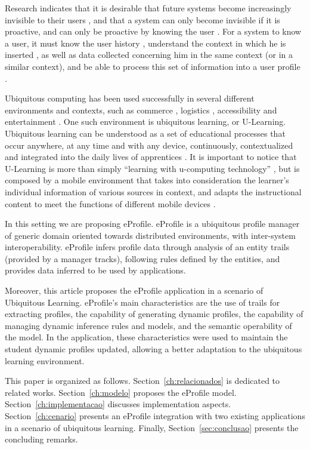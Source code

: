 \documentclass[preprint,authoryear,12pt,dvipdfm]{elsarticle}
\begin{document}
Research indicates that it is desirable that future systems become increasingly invisible to their users \citep{weiser96}, and that a system can only become invisible if it is proactive, and can only be proactive by knowing the user \citep{satyanarayanan01}. For a system to know a user, it must know the user history \citep{silva10}, understand the context in which he is inserted \citep{dey2001}, as well as data collected concerning him in the same context (or in a similar context), and be able to process this set of information into a user profile \citep{fischer01,viviani10}.

Ubiquitous computing has been used successfully in several different environments and contexts, such as commerce \citep{franco11}, logistics \citep{oliveira13}, accessibility \citep{tavares12} and entertainment \citep{segatto08}. One such environment is ubiquitous learning, or U-Learning. Ubiquitous learning can be understood as a set of educational processes that occur anywhere, at any time and with any device, continuously, contextualized and integrated into the daily lives of apprentices \citep{barbosa11}. It is important to notice that U-Learning is more than simply ``learning with u-computing technology'' \citep{hwang07}, but is composed by a mobile environment that takes into consideration the learner's individual information of various sources in context, and adapts the instructional content to meet the functions of different mobile devices \citep{hwang08}.

In this setting we are proposing eProfile. eProfile is a ubiquitous profile manager of generic domain oriented towards distributed environments, with inter-system interoperability. eProfile infers profile data through analysis of an entity trails (provided by a manager tracks), following rules defined by the entities, and provides data inferred to be used by applications.

Moreover, this article proposes the eProfile application in a scenario of Ubiquitous Learning. eProfile's main characteristics are the use of trails for extracting profiles, the capability of generating dynamic profiles, the capability of managing dynamic inference rules and models, and the semantic operability of the model. In the application, these characteristics were used to maintain the student dynamic profiles updated, allowing a better adaptation to the ubiquitous learning environment.

This paper is organized as follows. Section~\ref{ch:relacionados} is dedicated to related works. Section~\ref{ch:modelo} proposes the eProfile model. Section~\ref{ch:implementacao} discusses implementation aspects. Section~\ref{ch:cenario} presents an eProfile integration with two existing applications in a scenario of ubiquitous learning. Finally, Section~\ref{sec:conclusao} presents the concluding remarks.
\end{document}
